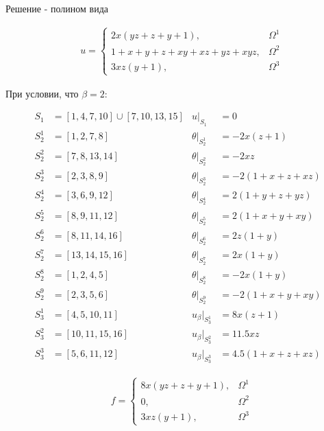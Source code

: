 \documentclass[12pt, a4paper]{article}
\begin{document}
\noindent Решение - полином вида

\vspace{1mm}
\begin{align*}
  &u = 
  \begin{cases} 
      2x(yz + z + y + 1), & \Omega^1 \\
      1 + x + y + z + xy + xz + yz + xyz, & \Omega^2 \\
      3xz(y + 1), & \Omega^3
  \end{cases}
\end{align*}
\vspace{1mm}

\noindent При условии, что $\beta = 2$: 

\begin{align*}
  S_1 &= \left[ 1, 4, 7, 10 \right] \cup \left[ 7, 10, 13, 15 \right] & u|_{S_1} &= 0 \\
  S_2^1 &= \left[ 1, 2, 7, 8 \right] & \theta|_{S_2^1} &= -2x(z + 1) \\
  S_2^2 &= \left[ 7, 8, 13, 14 \right] & \theta|_{S_2^2} &= -2xz \\
  S_2^3 &= \left[ 2, 3, 8, 9 \right] & \theta|_{S_2^3} &= -2(1 + x + z + xz) \\
  S_2^4 &= \left[ 3, 6, 9, 12 \right] & \theta|_{S_2^4} &= 2(1 + y + z + yz) \\
  S_2^5 &= \left[ 8, 9, 11, 12 \right] & \theta|_{S_2^5} &= 2(1 + x + y + xy) \\
  S_2^6 &= \left[ 8, 11, 14, 16 \right] & \theta|_{S_2^6} &= 2z(1 + y) \\
  S_2^7 &= \left[ 13, 14, 15, 16 \right] & \theta|_{S_2^7} &= 2x(1 + y) \\
  S_2^8 &= \left[ 1, 2, 4, 5 \right] & \theta|_{S_2^8} &= -2x(1 + y) \\
  S_2^9 &= \left[ 2, 3, 5, 6 \right] & \theta|_{S_2^9} &= -2(1 + x + y + xy) \\
  S_3^1 &= \left[ 4, 5, 10, 11 \right] & u_{\beta}|_{S_3^1} &= 8x(z + 1) \\
  S_3^2 &= \left[ 10, 11, 15, 16 \right] & u_{\beta}|_{S_3^2} &= 11.5xz \\
  S_3^3 &= \left[ 5, 6, 11, 12 \right] & u_{\beta}|_{S_3^3} &= 4.5(1 + x + z + xz)
\end{align*}

\vspace{1mm}

\begin{align*}
  &f = 
  \begin{cases} 
      8x(yz + z + y + 1), & \Omega^1 \\
      0, & \Omega^2 \\
      3xz(y + 1), & \Omega^3
  \end{cases}
\end{align*}
\vspace{1mm}
\end{document}
